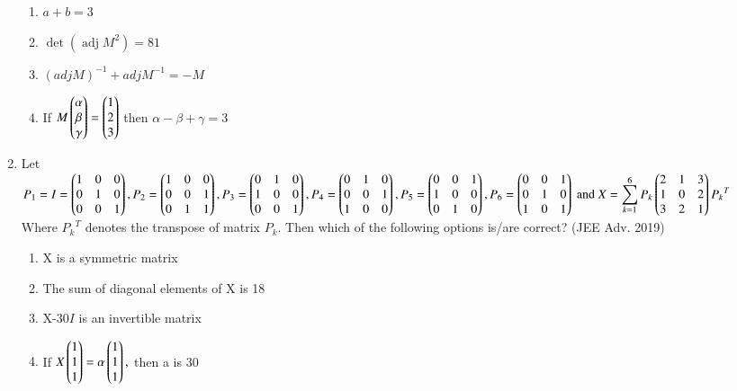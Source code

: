 \documentclass[journal,12pt,twocolumn]{IEEEtran}
\theoremstyle{remark}
\begin{document}
\begin{enumerate}
\begin{enumerate}
    \item $a+b=3$
    \item $\mathop{det}(\mathop{adj}M^2)=81$
    \item $(adjM)^{-1}+adjM^{-1}=-M$
    \item If $M\begin{pmatrix}
        \alpha\\
        \beta\\
        \gamma
\end{pmatrix} = \begin{pmatrix}
        1\\
        2\\
        3
\end{pmatrix}$ then $\alpha-\beta+\gamma=3$\\[2pt]
\end{enumerate}

\item Let\\
$
P_1=I=\begin{pmatrix}
    1 & 0 & 0\\
    0 & 1 & 0\\
    0 & 0 & 1
\end{pmatrix},  P_2 = \begin{pmatrix}
    1 & 0 & 0\\
    0 & 0 & 1\\
    0 & 1 & 1
\end{pmatrix},\\ P_3 = \begin{pmatrix}
    0 & 1 & 0\\
    1 & 0 & 0\\
    0 & 0 & 1
\end{pmatrix}, P_4 = \begin{pmatrix}
    0 & 1 & 0\\
    0 & 0 & 1\\
    1 & 0 & 0
\end{pmatrix},\\ P_5 = \begin{pmatrix}
    0 & 0 & 1\\
    1 & 0 & 0\\
    0 & 1 & 0
\end{pmatrix}, P_6 = \begin{pmatrix}
    0 & 0 & 1\\
    0 & 1 & 0\\
    1 & 0 & 1
\end{pmatrix}\\
\text{ and } \displaystyle X = \sum_{k=1}^{6}P_k\begin{pmatrix}
    2 & 1 & 3\\
    1 & 0 & 2\\
    3 & 2 & 1
\end{pmatrix}{P_k}^T$\\Where ${P_k}^T$ denotes the transpose of matrix $P_k$. Then which of the following options is/are correct? \hfill (JEE Adv. 2019)

\begin{enumerate}
	\item X is a symmetric matrix
	\item The sum of diagonal elements of X is 18
	\item X-30$I$ is an invertible matrix
	\item If $X\begin{pmatrix}1\\1\\1\end{pmatrix}=\alpha\begin{pmatrix}1\\1\\1\end{pmatrix},$ then a is 30\\[2pt]
\end{enumerate}


\end{enumerate}
\end{document}
